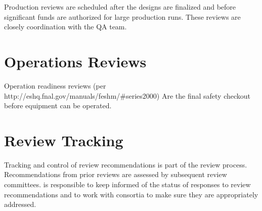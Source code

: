 Production reviews are scheduled after the designs are finalized and
before significant funds are authorized for large production
runs. These reviews are closely coordination with the QA team.

\section{Operations Reviews}

Operation readiness reviews (per
http://eshq.fnal.gov/manuals/feshm/\#series2000) Are the final safety
checkout before equipment can be operated.

\section{Review Tracking}

Tracking and control of review recommendations is part of the review
process. Recommendations from prior reviews are assessed by subsequent
review committees.  is responsible to keep informed of the
status of responses to review recommendations and to work with
consortia to make sure they are appropriately addressed.

